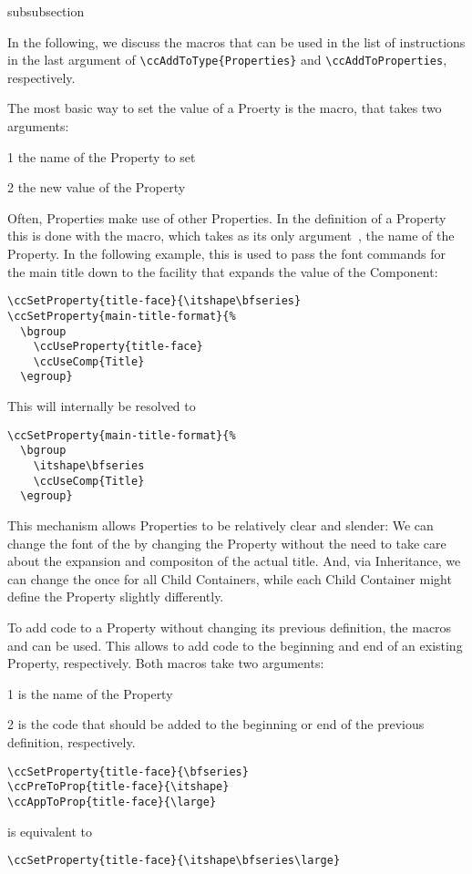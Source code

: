 \begin{Heading}{subsubsection}
\end{Heading}

In the following, we discuss the macros that can be used in the list
of instructions in the last argument of
\lstinline|\ccAddToType{Properties}| and
\lstinline|\ccAddToProperties|, respectively.

The most basic way to set the value of a Proerty is the
\DeclareMacro{\ccSetProperty} macro, that takes two arguments:
\begin{ArgList}
\item[1] the name of the Property to set
\item[2] the new value of the Property
\end{ArgList}

Often, Properties make use of other Properties. In the definition of a
Property this is done with the \DeclareMacro{\ccUseProperty} macro,
which takes as its only argument~, the name of the
Property. In the following example, this is used to pass the font
commands for the main title down to the facility that expands the
value of the  Component:
\begin{lstlisting}
\ccSetProperty{title-face}{\itshape\bfseries}
\ccSetProperty{main-title-format}{%
  \bgroup
    \ccUseProperty{title-face}
    \ccUseComp{Title}
  \egroup}
\end{lstlisting}
This will internally be resolved to
\begin{lstlisting}
\ccSetProperty{main-title-format}{%
  \bgroup
    \itshape\bfseries
    \ccUseComp{Title}
  \egroup}
\end{lstlisting}
This mechanism allows Properties to be relatively clear and slender:
We can change the font of the  by changing the
 Property without the need to take care
about the expansion and compositon of the actual title. And, via
Inheritance, we can change the  once for
all Child Containers, while each Child Container might define the
 Property slightly differently.

To add code to a Property without changing its previous definition,
the macros \DeclareMacro{\ccAppToProp} and
\DeclareMacro{\ccPreToProp} can be used. This allows to add code to
the beginning and end of an existing Property, respectively. Both
macros take two arguments:
\begin{ArgList}
\item[1] is the name of the Property
\item[2] is the code that should be added to the beginning or end of
  the previous definition, respectively.
\end{ArgList}
\begin{lstlisting}
\ccSetProperty{title-face}{\bfseries}
\ccPreToProp{title-face}{\itshape}
\ccAppToProp{title-face}{\large}
\end{lstlisting}
is equivalent to
\begin{lstlisting}
\ccSetProperty{title-face}{\itshape\bfseries\large}
\end{lstlisting}

